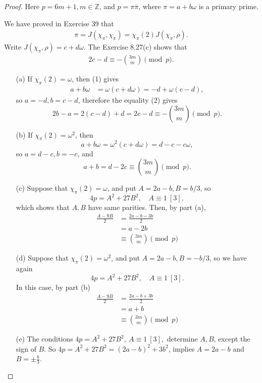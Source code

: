 \documentclass[11pt,a4paper]{article}
\newcommand{\Z}{\mathbb{Z}}
\begin{document}
\begin{proof}
Here $p = 6m + 1, m \in \Z$, and $p = \pi \overline{\pi}$, where $\pi = a + b\omega$ is a primary prime.

We have proved in Exercise 39 that
\begin{align}
\pi = J(\chi_\pi,\chi_\pi) = \chi_\pi(2) J(\chi_\pi,\rho).
\end{align}
Write $J(\chi_\pi,\rho) = c + d \omega$. The Exercise 8.27(c) shows that
\begin{align}
2c -d \equiv -\binom{3m}{m} \pmod p.
\end{align}

\begin{enumerate}
\item[(a)] If $\chi_\pi(2) = \omega$, then (1) gives
\begin{align*}
a + b \omega &= \omega (c+ d\omega) =-d+ \omega(c-d),
\end{align*}
so $a = -d, b = c-d$, therefore the equality (2) gives
$$2b-a = 2(c-d)+ d = 2c -d \equiv -\binom{3m}{m} \pmod p.$$


\item[(b)] If $\chi_\pi(2) = \omega^2$, then
$$a + b \omega = \omega^2 (c+ d\omega) = d-c -c\omega,$$
so $a = d-c, b = -c$, and
$$a + b =d-2c\equiv \binom{3m}{m} \pmod p.$$

\item[(c)] Suppose that $\chi_\pi(2) = \omega$, and put $A = 2a-b, B = b/3$, so $$4p = A^2 + 27 B^2,\quad A\equiv 1 \ [3],$$
which shows that $A,B$ have same parities. Then, by part (a),
\begin{align*}
\frac{A-9B}{2} &= \frac{2a-b - 3b}{2}\\
&=a-2b\\
&\equiv \binom{3m}{m} \pmod p
\end{align*}

\item[(d)] Suppose that $\chi_\pi(2) = \omega^2$, and put $A = 2a-b, B = -b/3$, so we have again
 $$4p = A^2 + 27 B^2,\quad A\equiv 1 \ [3].$$
In this case, by part (b)
\begin{align*}
 \frac{A-9B}{2} &= \frac{2a-b +3b}{2}\\
 &=a+b\\
&\equiv \binom{3m}{m} \pmod p
 \end{align*}
 
 \item[(e)] The conditions $4p = A^2 + 27 B^2,\ A\equiv 1 \ [3],$ determine $A,B$, except the sign of $B$. So $4p = A^2 + 27 B^2 = (2a-b)^2 + 3b^2$, implies $A = 2a-b$ and $B = \pm \frac{b}{3}$.
 

\end{enumerate}
\end{proof}
\end{document}
